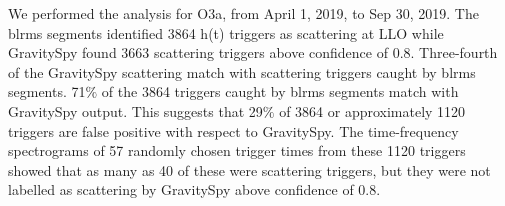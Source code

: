 \documentclass[12pt]{iopart}
\begin{document}


We performed the analysis for O3a, from April 1, 2019, to Sep 30, 2019. The blrms segments identified 3864 h(t) triggers as scattering at LLO while GravitySpy found 3663 scattering triggers above confidence of 0.8.  Three-fourth of the GravitySpy scattering match with scattering triggers caught by blrms segments. 71$\%$ of the 3864 triggers caught by blrms segments match with GravitySpy output. This suggests that 29$\%$ of 3864 or approximately 1120 triggers are false positive with respect to GravitySpy. 
The time-frequency spectrograms of 57 randomly chosen trigger times from these 1120 triggers showed that as many as 40 of these were scattering triggers, but they were not labelled as scattering by GravitySpy above confidence of 0.8. 
\end{document}
